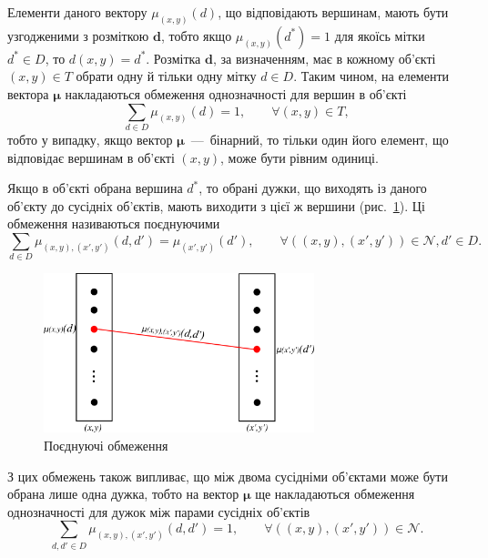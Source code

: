 Елементи даного вектору $\mu_{\left(x, y \right)} \left(d \right)$,
що відповідають вершинам, мають бути узгодженими з розміткою $\pmb{d}$,
тобто якщо $\mu_{\left(x, y \right)} \left(d^* \right) = 1$ для якоїсь мітки
$d^* \in D$,
то $d \left(x, y \right) = d^*$.
Розмітка $\pmb{d}$, за визначенням,
має в кожному об'єкті $\left(x, y \right) \in T$
обрати одну й тільки одну мітку $d \in D$.
Таким чином, на елементи вектора $\pmb{\mu}$
накладаються обмеження однозначності для вершин в об'єкті
\begin{equation} \label{vetrex:unambiguity}
    \sum \limits_{d \in D} \mu_{\left( x, y \right)} \left( d \right) = 1,
    \qquad \forall \left(x, y \right) \in T,
\end{equation}
тобто у випадку, якщо вектор $\pmb{\mu}$~---~бінарний,
то тільки один його елемент,
що відповідає вершинам в об'єкті $\left(x, y \right)$, може бути рівним одиниці.

Якщо в об'єкті обрана вершина $d^*$, то обрані дужки,
що виходять із даного об'єкту до сусідніх об'єктів,
мають виходити з цієї ж вершини (рис.~\ref{fig:combining:constraints}).
Ці обмеження називаються поєднуючими
\begin{equation} \label{combining:constraints}
    \sum \limits_{d \in D}
        \mu_{\left(x, y \right), \left(x', y' \right)} \left(d, d' \right) =
        \mu_{\left(x', y' \right)} \left(d' \right), \qquad
    \forall
    \left( \left(x, y \right), \left(x',y' \right) \right) \in \mathcal{N},
    d' \in D.
\end{equation}

\begin{figure}[h]
  \centering
  \includegraphics[width=0.7\textwidth]{images/combining_constraints}
  \caption{Поєднуючі обмеження}
  \label{fig:combining:constraints}
\end{figure}

З цих обмежень також випливає,
що між двома сусідніми об'єктами може бути обрана лише одна дужка,
тобто на вектор $\pmb{\mu}$
ще накладаються обмеження однозначності для дужок між парами сусідніх об'єктів
\begin{equation} \label{edge:unambiguity}
    \sum \limits_{d, d' \in D}
        \mu_{\left(x, y \right), \left(x', y' \right)} \left(d, d' \right) = 1,
        \qquad \forall
        \left(\left(x, y \right), \left(x', y' \right) \right) \in \mathcal{N}.
\end{equation}

